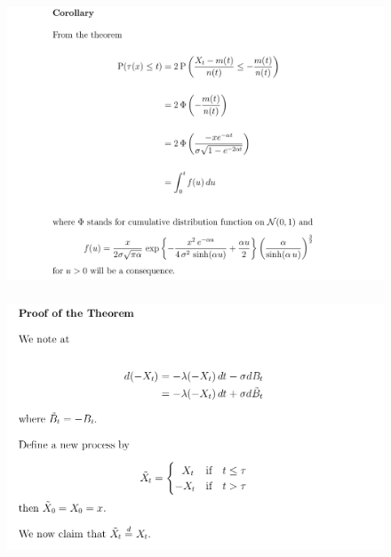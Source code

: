\documentclass[c, dvipsnames, 8pt]{beamer}
\begin{document}
\begin{frame}[shrink=5]
	
	
	\frametitle{\insertsection} 
	\begin{figure}
		\centering
		\includegraphics[width=1\linewidth]{screenshot018}
		\label{fig:screenshot001}
	\end{figure}
	


	
	
	
	
	
\end{frame}




\begin{frame}[shrink=5]
	
	
	\frametitle{\insertsection} 
	\begin{figure}
		\centering
		\includegraphics[width=1\linewidth]{screenshot019}
		\label{fig:screenshot001}
	\end{figure}
	
	
	
	
	
	
	
	
\end{frame}
\end{document}
